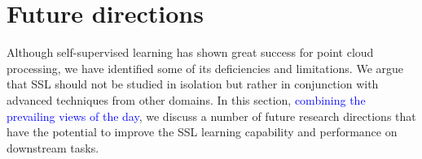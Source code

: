 \documentclass[a4paper,fleqn]{cas-dc}
\begin{document}
\begin{table}[]
    \centering
    \caption{Summary of performance of representative methods on object detection using SUN RGB-D \citep{song2015sun} and ScanNet \citep{dai2017scannet}. The pre-training input only contains the point cloud geometry.}
    \label{tab:object_detection}
\end{table}  
    

\section{Future directions}\label{sec:future}
Although self-supervised learning has shown great success for point cloud processing, we have identified some of its deficiencies and limitations. We argue that SSL should not be studied in isolation but rather in conjunction with advanced techniques from other domains. In this section, \textcolor{blue}{combining the prevailing views \citep{shao2022tracing} of the day}, we discuss a number of future research directions that have the potential to improve the SSL learning capability and performance on downstream tasks.
\end{document}
